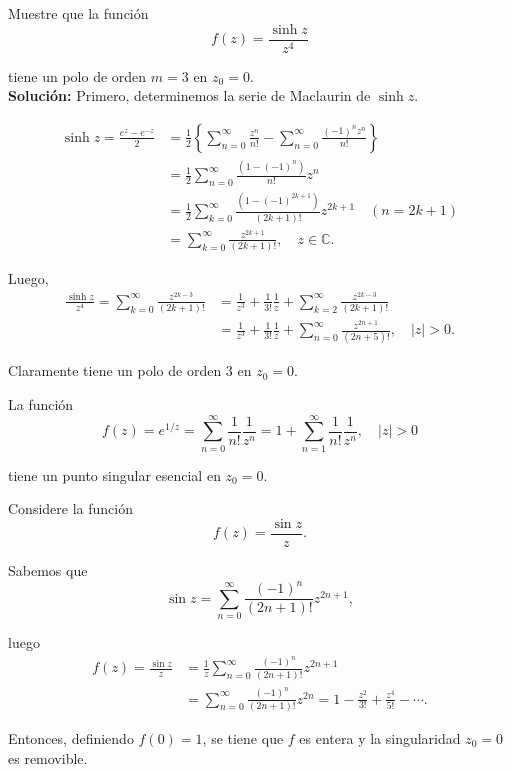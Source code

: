 \begin{ejemplo}
Muestre que la función
$$f(z) = \frac{\sinh z}{z^4}$$

tiene un polo de orden $m = 3$ en $z_0 = 0$.
\\

\textbf{Solución:} Primero, determinemos la serie de Maclaurin de $\sinh z$. 

\begin{align*}
    \sinh z = \frac{e^z - e^{-z}}{2} &= \frac{1}{2} \left\{ \sum_{n=0}^{\infty} \frac{z^n}{n!} - \sum_{n=0}^{\infty} \frac{(-1)^n z^n}{n!}  \right\} \\
    &= \frac{1}{2} \sum_{n=0}^{\infty} \frac{(1-(-1)^n)}{n!} z^n \\
    &= \frac{1}{2} \sum_{k=0}^{\infty} \frac{(1-(-1)^{2k+1})}{(2k+1)!} z^{2k+1} \quad (n = 2k+1)\\
    &= \sum_{k=0}^{\infty} \frac{z^{2k+1}}{(2k+1)!}, \quad z \in \mathbb{C}.
\end{align*}

Luego,
\begin{align*}
 \frac{\sinh z}{z^4} = \sum_{k=0}^{\infty} \frac{z^{2k-3}}{(2k+1)!}& = \frac{1}{z^3} + \frac{1}{3!} \frac{1}{z} +\sum_{k=2}^{\infty} \frac{z^{2k-3}}{(2k+1)!} \\
 &=  \frac{1}{z^3} + \frac{1}{3!} \frac{1}{z} +\sum_{n=0}^{\infty} \frac{z^{2n+1}}{(2n+5)!}, \quad |z| > 0.    
\end{align*}

Claramente tiene un polo de orden 3 en $z_0 = 0$.

\end{ejemplo}

\begin{ejemplo}
La función
$$f(z) = e^{1/z} = \sum_{n=0}^{\infty} \frac{1}{n!} \frac{1}{z^n} = 1 +  \sum_{n=1}^{\infty} \frac{1}{n!} \frac{1}{z^n}, \quad |z| > 0$$

tiene un punto singular esencial en $z_0 = 0$.
\end{ejemplo}

\begin{ejemplo}
Considere la función 
$$f(z) = \frac{\sin z}{z}.$$

Sabemos que
$$\sin z = \sum_{n=0}^{\infty} \frac{(-1)^n}{(2n+1)!} z^{2n+1},$$

luego
\begin{align*}
    f(z) = \frac{\sin z}{z} &= \frac{1}{z}  \sum_{n=0}^{\infty} \frac{(-1)^n}{(2n+1)!} z^{2n+1} \\
    &= \sum_{n=0}^{\infty} \frac{(-1)^n}{(2n+1)!} z^{2n} = 1 - \frac{z^2}{3!} + \frac{z^4}{5!} - \cdots.
\end{align*}

Entonces, definiendo $f(0) = 1$, se tiene que $f$ es entera y la singularidad $z_0 = 0$ es removible. 
\end{ejemplo}

